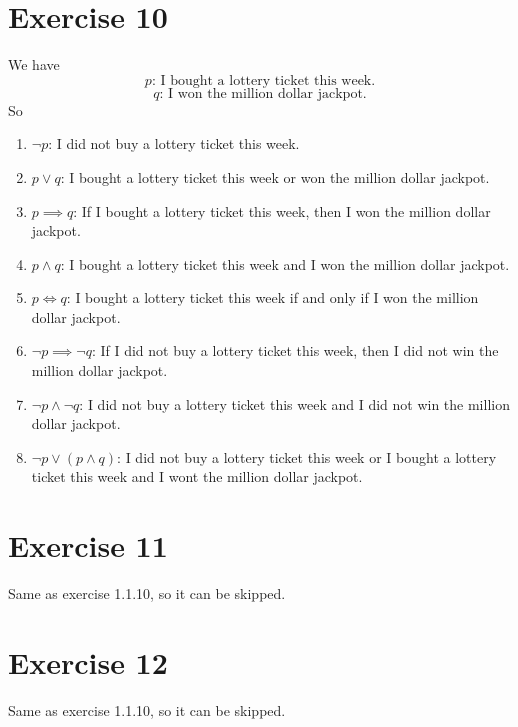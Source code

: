 \documentclass[12pt]{article}
\begin{document}
    \section*{Exercise 10}
    We have 
    \[ p \text{: I bought a lottery ticket this week.} \]
    \[ q \text{: I won the million dollar jackpot.} \]
    So
    \begin{enumerate}[label=\textbf{\alph*.}]
        \item
            $\neg p$: I did not buy a lottery ticket this week.
        \item
            $p \lor q$: I bought a lottery ticket this week
            or won the million dollar jackpot.
        \item 
            $p \implies q$: If I bought a lottery ticket this week,
            then I won the million dollar jackpot.
        \item 
            $p \land q$: I bought a lottery ticket this week
            and I won the million dollar jackpot.
        \item
            $p \iff q$: I bought a lottery ticket this week if and only if
            I won the million dollar jackpot.
        \item
            $\neg p \implies \neg q$:
            If I did not buy a lottery ticket this week,
            then I did not win the million dollar jackpot.
        \item
            $\neg p \land \neg q$:
            I did not buy a lottery ticket this week
            and I did not win the million dollar jackpot.
        \item 
            $\neg p \lor (p \land q)$:
            I did not buy a lottery ticket this week
            or I bought a lottery ticket this week
            and I wont the million dollar jackpot.
    \end{enumerate}


    \section*{Exercise 11}
    Same as exercise 1.1.10, so it can be skipped.

    
    \section*{Exercise 12}
    Same as exercise 1.1.10, so it can be skipped.
\end{document}
